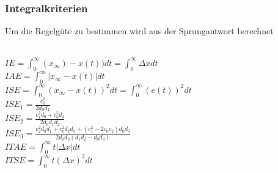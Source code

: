 \subsubsection{Integralkriterien}
Um die Regelgüte zu bestimmen wird aus der Sprungantwort berechnet\\


\begin{minipage}{0.45\textwidth}
  \\

$IE = \int_{0}^{\infty}(x_{\infty})-x(t))dt = \int_{0}^{\infty} \Delta xdt $\\
$IAE = \int_{0}^{\infty}  | x_{\infty}-x(t) | dt $\\
$ ISE = \int_{0}^{\infty} (x_{\infty}-x(t))^2dt = \int_{0}^{\infty}(e(t))^2 dt  $\\

$ ISE_1 = \frac{c_0^2}{2d_0d_1}$\\
$ ISE_2 = \frac{c_1^2d_0+c_0^2d_2}{2d_0d_1d_2}$ \\
$ ISE_3 = \frac{c_2^2d_0d_1+c_0^2d_2d_3+(c_1^2-2c_0c_2)d_0d_3}{2d_0d_3(d_1d_2-d_0d_3)}$\\

$ ITAE =  \int_{0}^{\infty}t |\Delta x|dt $\\
$ ITSE =  \int_{0}^{\infty}t (\Delta x)^2dt $\\

\end{minipage}
\begin{minipage}{0.45\textwidth}

\end{minipage}

